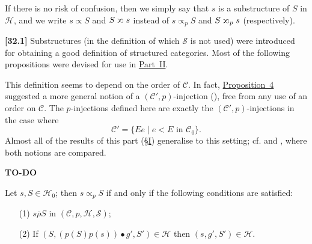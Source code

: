\documentclass[a4paper,fleqn]{article}
\theoremstyle{plain}
\newenvironment{proposition}[1]
  {\renewcommand\theinnerproposition{#1}\innerproposition}
  {\endinnerproposition}
\theoremstyle{definition}
\newenvironment{longcomm}[1]
  {\noindent\textbf{[#1]}\rmfamily}
  {}
\newcommand{\todo}{{\color{purple}\textbf{TO-DO }}}
\newcommand{\CC}{\mathcal{C}}
\newcommand{\HH}{\mathcal{H}}
\renewcommand{\SS}{\mathcal{S}}
\newcommand{\relrhobar}{\mathrel{\overline{\rho}}}
\newcommand{\subs}{\mathrel{\propto}}
\newcommand{\sups}{\mathrel{\reflectbox{$\propto$}}}
\begin{document}
If there is no risk of confusion, then we simply say that $s$ is a substructure of $S$ in $\HH$, and we write $s\subs S$ and $S\sups s$ instead of $s\subs_p S$ and $S\sups_p s$ (respectively).

\begin{longcomm}{32.1}
  Substructures (in the definition of which $\SS$ is not used) were introduced for obtaining a good definition of structured categories.
  Most of the following propositions were devised for use in \hyperref[section:ii]{Part~II}.

  This definition seems to depend on the order of $\CC$.
  In fact, \hyperref[proposition:i-4]{Proposition~4} suggested a more general notion of a $(\CC',p)$-injection (\cite{coll69,coll66}), free from any use of an order on $\CC$.
  The $p$-injections defined here are exactly the $(\CC',p)$-injections in the case where
  \[
    \CC'
    = \{Ee \mid e<E\text{ in }\CC_0\}.
  \]
  Almost all of the results of this part (\hyperref[section:i]{§I}) generalise to this setting; cf. \cite{coll66} and \cite{coll69}, where both notions are compared.

  \todo
\end{longcomm}

\begin{proposition}{4}
\label{proposition:i-4}
  Let $s,S\in\HH_0$;
  then $s\subs_p S$ if and only if the following conditions are satisfied:
  \begin{enumerate}
    \item[\normalfont(1\textquotesingle)]
      $s\relrhobar S$ in $(\CC,p,\HH,\SS)$;
    \item[\normalfont(2\textquotesingle)]
      If $(S,(p(S)p(s))\bullet g',S')\in\HH$ then $(s,g',S')\in\HH$.
  \end{enumerate}
\end{proposition}
\end{document}
